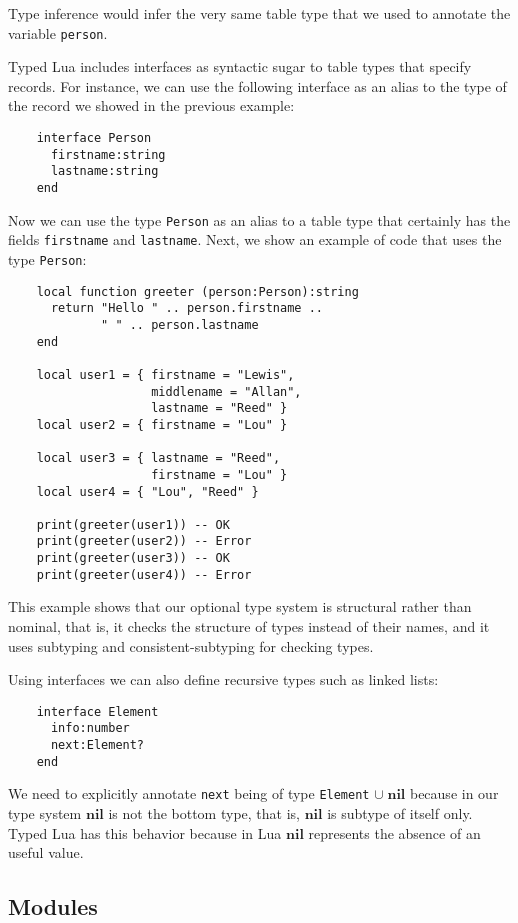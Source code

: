 \documentclass[preprint]{sig-alternate}
\newcommand{\Nil}{\mathbf{nil}}
\begin{document}
Type inference would infer the very same table type that we used to
annotate the variable \texttt{person}.

Typed Lua includes interfaces as syntactic sugar to table types
that specify records.
For instance, we can use the following interface as an alias to the
type of the record we showed in the previous example:
\begin{verbatim}
    interface Person
      firstname:string
      lastname:string
    end
\end{verbatim}

Now we can use the type \texttt{Person} as an alias to a table type
that certainly has the fields \texttt{firstname} and \texttt{lastname}.
Next, we show an example of code that uses the type \texttt{Person}:
\begin{verbatim}
    local function greeter (person:Person):string
      return "Hello " .. person.firstname ..
             " " .. person.lastname
    end

    local user1 = { firstname = "Lewis",
                    middlename = "Allan",
                    lastname = "Reed" }
    local user2 = { firstname = "Lou" }

    local user3 = { lastname = "Reed",
                    firstname = "Lou" }
    local user4 = { "Lou", "Reed" }

    print(greeter(user1)) -- OK
    print(greeter(user2)) -- Error
    print(greeter(user3)) -- OK
    print(greeter(user4)) -- Error
\end{verbatim}

This example shows that our optional type system is structural rather
than nominal, that is, it checks the structure of types instead of
their names, and it uses subtyping and consistent-subtyping for
checking types.

Using interfaces we can also define recursive types such as linked
lists:

\begin{verbatim}
    interface Element
      info:number
      next:Element?
    end
\end{verbatim}

We need to explicitly annotate \texttt{next} being of type
\texttt{Element} $\cup\;\Nil$ because in our type system $\Nil$
is not the bottom type, that is, $\Nil$ is subtype of itself only.
Typed Lua has this behavior because in Lua $\Nil$ represents
the absence of an useful value.

\subsection{Modules}
\end{document}
